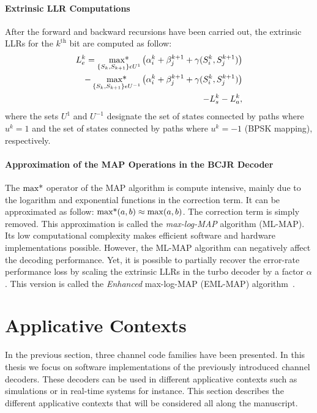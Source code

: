 \paragraph{Extrinsic LLR Computations}

After the forward and backward recursions have been carried out, the extrinsic
LLRs for the $k^\text{th}$ bit are computed as follow:
\begin{equation}
  \label{eq:ctx_turbo_ext}
  \begin{aligned}
  L_e^k = \operatorname*{max*}_{\{S_k, S_{k+1}\}\epsilon U^1}\big( \alpha_i^k + \beta_j^{k+1} +
  \gamma(S_i^k, S_j^{k+1}) \big) \\
  - \operatorname*{max*}_{\{S_k, S_{k+1}\}\epsilon U^{-1}}\big( \alpha_i^k + \beta_j^{k+1} +
  \gamma(S_i^k, S_j^{k+1}) \big) \\
  - L_{s}^k - L_a^k,
  \end{aligned}
\end{equation}
where the sets $U^1$ and $U^{-1}$ designate the set of states connected by paths
where $u^k=1$ and the set of states connected by paths where $u^k=-1$ (BPSK
mapping), respectively.

\paragraph{Approximation of the MAP Operations in the BCJR Decoder}

The $\operatorname*{max*}$ operator of the MAP algorithm is compute intensive, mainly due to
the logarithm and exponential functions in the correction term. It can be
approximated as follow: $\operatorname*{max*}(a,b) \approx \max(a,b)$. The correction term
is simply removed. This approximation is called the \emph{max-log-MAP} algorithm
(ML-MAP). Its low computational complexity makes efficient software and hardware
implementations possible. However, the ML-MAP algorithm can negatively affect
the decoding performance. Yet, it is possible to partially recover the
error-rate performance loss by scaling the extrinsic LLRs in the turbo decoder
by a factor $\alpha$. This version is called the \emph{Enhanced} max-log-MAP
(EML-MAP) algorithm~\cite{Vogt2000,Studer2011}.

\section{Applicative Contexts}

In the previous section, three channel code families have been presented. In
this thesis we focus on software implementations of the previously introduced
channel decoders. These decoders can be used in different applicative contexts
such as simulations or in real-time systems for instance. This section
describes the different applicative contexts that will be considered all along
the manuscript.

